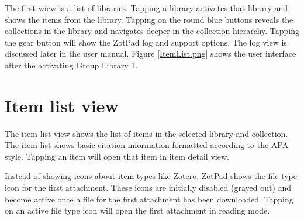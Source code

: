 \documentclass[oneside, openany, 12pt]{tufte-book}
\newcommand{\iphone}[1]{#1}
\newcommand{\ipad}[1]{}
\newcommand{\image}[2]{
	\center
	\fbox{\texttt{[image: images/iPhone/\{\#2]}}}

	\refstepcounter{figure}
	\smallskip\noindent\small Figure \thefigure: #1
	\label{#2}
	}
\newcommand{\ipadfootnote}[1]{}
\newcommand{\iphone}[1]{}
\newcommand{\ipad}[1]{#1}
\newcommand{\image}[2]{
	\caption{#1}
	\label{#2}
	\fbox{\texttt{[image: images/iPad/\{\#2]}}}
	}
\newcommand{\ipadfootnote}[1]{\footnote{#1}}
\begin{document}
\ipad{The bottom of the navigator shows cache status bar. This bar shows the number of items that are are queued for retrieval from the Zotero data server, and the number of files that are queud for downloading and uploading, and the amount of cache space used. \ipadfootnote{The item downloads shows the number of toplevel items, attachments, and notes. For example, an article with an attachment and two notes is four items in the counter. The cache mechanism is discussed in more detail in Chapter \label{chapt:settings} that discusses ZotPad settings.} Tapping the gear button will show the ZotPad log and support options. The log view is discussed later in the user manual.

Initially the navigator displays the list of libraries that you have access to.} \iphone{The first wiew is a list of libraries. } Tapping a library activates that library and shows the items from the library\ipad{ as a list in the content view}. Tapping on the round blue buttons reveals the collections in the library and navigates deeper in the collection hierarchy. \iphone{Tapping the gear button will show the ZotPad log and support options. The log view is discussed later in the user manual.} Figure \ref{ItemList.png} shows the user interface after the activating Group Library 1\ipad{ and tapping the round blue button to reveal the collections in the library}.

\FloatBarrier

\begin{figure}
\image{Item list\ipad{ and collections}}{ItemList.png}
\end{figure}

\section{Item list view}

The item list view shows the list of items in the selected library and collection. The item list shows basic citation information formatted according to the APA style. Tapping an item will open that item in item detail view. 

Instead of showing icons about item types like Zotero, ZotPad shows the file type icon for the first attachment. These icons are initially disabled (grayed out) and become active once a file for the first attachment has been downloaded. Tapping on an active file type icon will open the first attachment in reading mode.

\begin{figure}
\image{Searching item list}{Search.png}
\end{figure}
\end{document}
